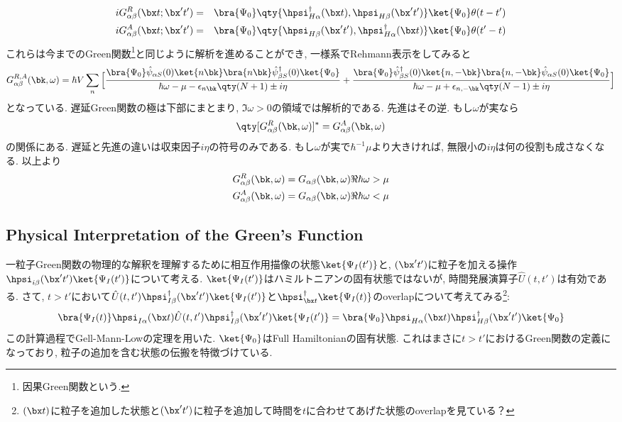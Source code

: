 \documentclass[10.5pt,a4paper]{jreport}
\begin{document}
\begin{eqnarray}
  iG^R_{\alpha\beta}(\bx t;\bx't') &=& \bra{\Psi_0}\qty{\hpsi^\dagger_{H\alpha}(\bx t), \hpsi_{H\beta}(\bx't')}\ket{\Psi_0}\theta(t-t')\\
  iG^A_{\alpha\beta}(\bx t;\bx't') &=& \bra{\Psi_0}\qty{\hpsi_{H\beta}(\bx't'), \hpsi^\dagger_{H\alpha}(\bx t)}\ket{\Psi_0}\theta(t'-t)
\end{eqnarray}
これらは今までのGreen関数\footnote{因果Green関数という.}と同じように解析を進めることができ, 一様系でRehmann表示をしてみると
\begin{eqnarray}
  G_{\alpha\beta}^{R, A}(\bk, \omega) = \hbar V\sum_n\Big[\frac{\bra{\Psi_0}\hat{\psi}_{\alpha S}(0)\ket{n\bk}\bra{n\bk}\hat{\psi}^\dagger_{\beta S}(0)\ket{\Psi_0}}{\hbar\omega -\mu - \epsilon_{n\bk}\qty(N+1) \pm i\eta}+ \frac{\bra{\Psi_0}\hat{\psi}^\dagger_{\beta S}(0)\ket{n, -\bk}\bra{n, -\bk}\hat{\psi}_{\alpha S}(0)\ket{\Psi_0}}{\hbar\omega -\mu + \epsilon_{n,-\bk}\qty(N-1) \pm i\eta}\Big]\label{green-rehmann2}
\end{eqnarray}
となっている. 遅延Green関数の極は下部にまとまり, $\Im \omega > 0$の領域では解析的である. 先進はその逆. もし$\omega$が実なら
\begin{eqnarray}
  \qty[G_{\alpha\beta}^{R}(\bk, \omega)]^* = G_{\alpha\beta}^{A}(\bk, \omega)
\end{eqnarray}
の関係にある. 遅延と先進の違いは収束因子$i\eta$の符号のみである. もし$\omega$が実で$\hbar^{-1}\mu$より大きければ, 無限小の$i\eta$は何の役割も成さなくなる. 以上より
\begin{eqnarray}
  G_{\alpha\beta}^R(\bk, \omega) = G_{\alpha\beta}(\bk, \omega) & \Re\hbar\omega > \mu\\
  G_{\alpha\beta}^A(\bk, \omega) = G_{\alpha\beta}(\bk, \omega) & \Re\hbar\omega < \mu
\end{eqnarray}
\subsection{Physical Interpretation of the Green's Function}
一粒子Green関数の物理的な解釈を理解するために相互作用描像の状態$\ket{\Psi_I(t')}$と, $(\bx't')$に粒子を加える操作$\hpsi_{i\beta}(\bx't')\ket{\Psi_I(t')}$について考える. $\ket{\Psi_I(t')}$はハミルトニアンの固有状態ではないが, 時間発展演算子$\hat{U}(t, t')$は有効である. さて, $t>t'$において$\hat{U}(t, t')\hpsi_{I\beta}^\dagger(\bx't')\ket{\Psi_I(t')}$と$\hpsi^\dagger_{\bx t}\ket{\Psi_I(t)}$のoverlapについて考えてみる\footnote{$(\bx t)$に粒子を追加した状態と$(\bx't')$に粒子を追加して時間を$t$に合わせてあげた状態のoverlapを見ている？}:
\begin{eqnarray}
  \bra{\Psi_I(t)}\hpsi_{I\alpha}(\bx t)\hat{U}(t, t')\hpsi^\dagger_{I\beta}(\bx't')\ket{\Psi_I(t')} = \bra{\Psi_0}\hpsi_{H\alpha}(\bx t)\hpsi^\dagger_{H\beta}(\bx't')\ket{\Psi_0}
\end{eqnarray}
この計算過程でGell-Mann-Lowの定理を用いた. $\ket{\Psi_0}$はFull Hamiltonianの固有状態. これはまさに$t>t'$におけるGreen関数の定義になっており, 粒子の追加を含む状態の伝搬を特徴づけている.
\end{document}
